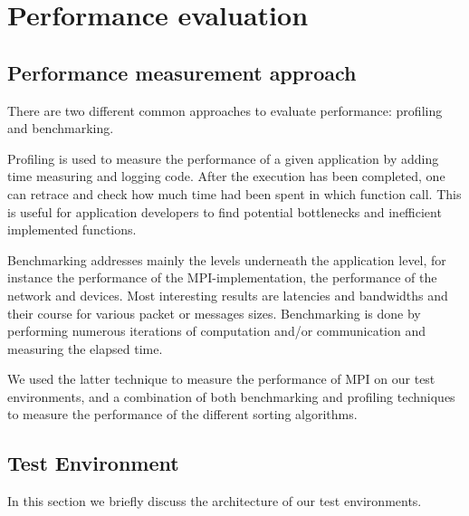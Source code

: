 \section{Performance evaluation}

\subsection{Performance measurement approach}
\label{test-env}
There are two different common approaches to evaluate performance: profiling and benchmarking.

Profiling is used to measure the performance of a given application by adding time measuring and logging code. After the execution has been completed, one can retrace and check how much time had been spent in which function call. This is useful for application developers to find potential bottlenecks and inefficient implemented functions.

Benchmarking addresses mainly the levels underneath the application level, for instance the performance
of the MPI-implementation, the performance of the network and devices. Most interesting results are latencies and bandwidths and their course for various packet or messages sizes. Benchmarking is done by performing numerous iterations of computation and/or communication and measuring the elapsed time.

We used the latter technique to measure the performance of MPI on our test environments, and a combination of both benchmarking and profiling techniques to measure the performance of the different sorting algorithms.

\subsection{Test Environment}
In this section we briefly discuss the architecture of our test environments. 

